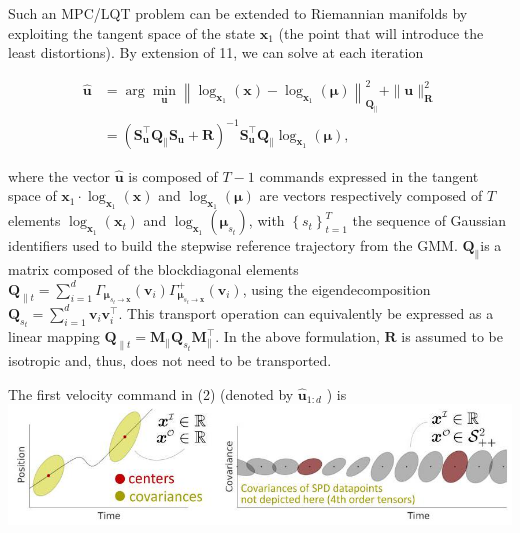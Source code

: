 \documentclass[10pt]{article}
\begin{document}
Such an MPC/LQT problem can be extended to Riemannian manifolds by exploiting the tangent space of the state $\boldsymbol{x}_{1}$ (the point that will introduce the least distortions). By extension of 11, we can solve at each iteration

$$
\begin{aligned}
\hat{\boldsymbol{u}} & =\arg \min _{\boldsymbol{u}}\left\|\log _{\boldsymbol{x}_{1}}(\boldsymbol{x})-\log _{\boldsymbol{x}_{1}}(\boldsymbol{\mu})\right\|_{\boldsymbol{Q}_{\|}}^{2}+\|\boldsymbol{u}\|_{\boldsymbol{R}}^{2} \\
& =\left(\boldsymbol{S}_{\boldsymbol{u}}^{\top} \boldsymbol{Q}_{\|} \boldsymbol{S}_{\boldsymbol{u}}+\boldsymbol{R}\right)^{-1} \boldsymbol{S}_{\boldsymbol{u}}^{\top} \boldsymbol{Q}_{\|} \log _{\boldsymbol{x}_{1}}(\boldsymbol{\mu}),
\end{aligned}
$$

where the vector $\hat{\boldsymbol{u}}$ is composed of $T-1$ commands expressed in the tangent space of $\boldsymbol{x}_{1} \cdot \log _{\boldsymbol{x}_{1}}(\boldsymbol{x})$ and $\log _{\boldsymbol{x}_{1}}(\boldsymbol{\mu})$ are vectors respectively composed of $T$ elements $\log _{\boldsymbol{x}_{1}}\left(\boldsymbol{x}_{t}\right)$ and $\log _{\boldsymbol{x}_{1}}\left(\boldsymbol{\mu}_{s_{t}}\right)$, with $\left\{s_{t}\right\}_{t=1}^{T}$ the sequence of Gaussian identifiers used to build the stepwise reference trajectory from the GMM. $\boldsymbol{Q}_{\|}$is a matrix composed of the blockdiagonal elements $\boldsymbol{Q}_{\| t}=\sum_{i=1}^{d} \Gamma_{\boldsymbol{\mu}_{s_{t} \rightarrow \boldsymbol{x}}}\left(\boldsymbol{v}_{i}\right) \Gamma_{\boldsymbol{\mu}_{s_{t} \rightarrow \boldsymbol{x}}}^{+}\left(\boldsymbol{v}_{i}\right)$, using the eigendecomposition $\boldsymbol{Q}_{s_{t}}=\sum_{i=1}^{d} \boldsymbol{v}_{i} \boldsymbol{v}_{i}^{\top}$. This transport operation can equivalently be expressed as a linear mapping $\boldsymbol{Q}_{\| t}=\boldsymbol{M}_{\|} \boldsymbol{Q}_{s_{t}} \boldsymbol{M}_{\|}^{\top}$. In the above formulation, $\boldsymbol{R}$ is assumed to be isotropic and, thus, does not need to be transported.

The first velocity command in (2) (denoted by $\hat{\boldsymbol{u}}_{1: d}$ ) is
\includegraphics[max width=\textwidth, center]{2023_01_25_b4240e152b7ba97a594cg-07}
\end{document}
